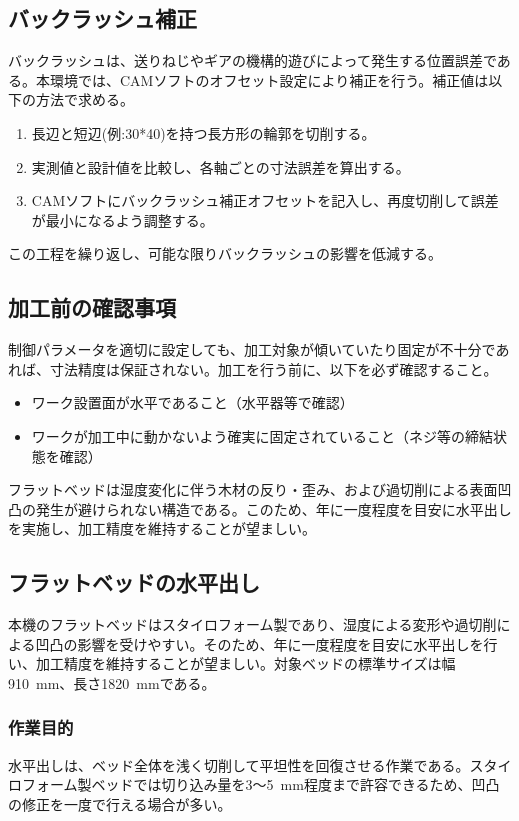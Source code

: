 \documentclass[uplatex,dvipdfmx]{ujarticle}
\begin{document}
\subsection{バックラッシュ補正}
バックラッシュは、送りねじやギアの機構的遊びによって発生する位置誤差である。本環境では、CAMソフトのオフセット設定により補正を行う。補正値は以下の方法で求める。

\begin{enumerate}
    \item 長辺と短辺(例:30*40)を持つ長方形の輪郭を切削する。
    \item 実測値と設計値を比較し、各軸ごとの寸法誤差を算出する。
    \item CAMソフトにバックラッシュ補正オフセットを記入し、再度切削して誤差が最小になるよう調整する。
\end{enumerate}

この工程を繰り返し、可能な限りバックラッシュの影響を低減する。

\subsection{加工前の確認事項}
制御パラメータを適切に設定しても、加工対象が傾いていたり固定が不十分であれば、寸法精度は保証されない。加工を行う前に、以下を必ず確認すること。
\begin{itemize}
    \item ワーク設置面が水平であること（水平器等で確認）
    \item ワークが加工中に動かないよう確実に固定されていること（ネジ等の締結状態を確認）
\end{itemize}
フラットベッドは湿度変化に伴う木材の反り・歪み、および過切削による表面凹凸の発生が避けられない構造である。このため、年に一度程度を目安に水平出しを実施し、加工精度を維持することが望ましい。
\subsection{フラットベッドの水平出し}

本機のフラットベッドはスタイロフォーム製であり、湿度による変形や過切削による凹凸の影響を受けやすい。そのため、年に一度程度を目安に水平出しを行い、加工精度を維持することが望ましい。対象ベッドの標準サイズは幅910~mm、長さ1820~mmである。

\subsubsection*{作業目的}
水平出しは、ベッド全体を浅く切削して平坦性を回復させる作業である。スタイロフォーム製ベッドでは切り込み量を3～5~mm程度まで許容できるため、凹凸の修正を一度で行える場合が多い。
\end{document}
